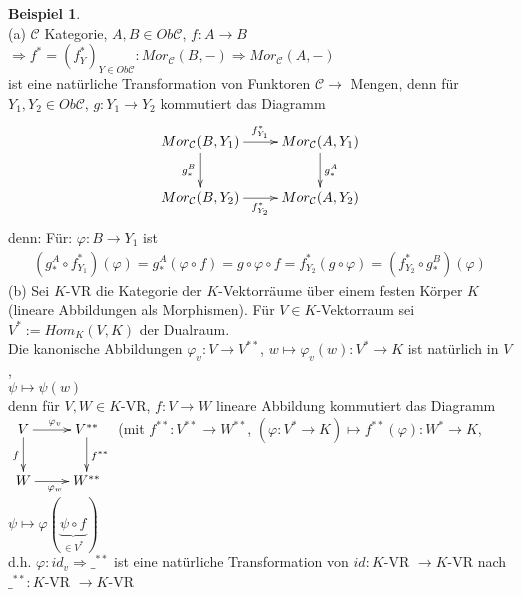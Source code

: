 \documentclass[10pt,a4paper,numbers=endperiod]{scrreprt}
\theoremstyle{definition}
\newtheorem{bsp}[satz]{Beispiel}
\begin{document}
\begin{bsp}
	$ $\\
	(a) $\mathcal{C}$ Kategorie, $A, B \in Ob \mathcal{C}$, $f: A \rightarrow B$\\
	$\Rightarrow f^* = (f_Y^*)_{Y \in Ob \mathcal{C}}: Mor_{\mathcal{C}} (B, -) \Rightarrow Mor_{\mathcal{C}}(A, -)$\\
	ist eine natürliche Transformation von Funktoren $\mathcal{C} \rightarrow$ Mengen, denn für $Y_1, Y_2 \in Ob \mathcal{C}$, $g: Y_1 \rightarrow Y_2$ kommutiert das Diagramm \begin{align*}
	\begin{xy}
	\xymatrix{
		Mor_\mathcal{C} (B, Y_1) \ar[r]^{f_{Y_1}^*} \ar[d]_{g_*^B}    &   Mor_\mathcal{C} (A, Y_1) \ar[d]^{g_*^A} \\
		Mor_\mathcal{C} (B, Y_2) \ar[r]_{f_{Y_2}^*} &   Mor_\mathcal{C} (A, Y_2)
	}
	\end{xy}
	\end{align*}
	denn: Für: $\varphi: B \rightarrow Y_1$ ist \begin{align*}
	(g_*^A \circ f_{Y_1}^*)(\varphi) = g_*^A (\varphi \circ f) = g \circ \varphi \circ f = f_{Y_2}^* (g \circ \varphi) = (f_{Y_2}^* \circ g_*^B) (\varphi) 
	\end{align*}
	(b) Sei $K$-VR die Kategorie der $K$-Vektorräume über einem festen Körper $K$ (lineare Abbildungen als Morphismen). Für $V \in K$-Vektorraum sei $V^* := Hom_K(V, K)$ der Dualraum.\\
	Die kanonische Abbildungen $\varphi_v: V \rightarrow V^{**}$, $w \mapsto \varphi_v(w): V^* \rightarrow K$ ist natürlich in $V$,\\
	\hspace*{81mm}	$\psi \mapsto \psi(w)$\\
	denn für $V, W \in K$-VR, $f: V \to W$ lineare Abbildung kommutiert das Diagramm\\ 
	$\begin{xy}
		\xymatrix{
			V \ar[r]^{\varphi_v} \ar[d]_{f}    &   V^{**} \ar[d]^{f^{**}} \\
			W \ar[r]_{\varphi_w} & W^{**}  
		}
	\end{xy}$  (mit $f^{**}: V^{**} \to W^{**}$, $(\varphi: V^* \to K) \mapsto f^{**}(\varphi): W^* \rightarrow K$, $\psi \mapsto \varphi(\underbrace{\psi \circ f}_{\in V^*})$\\
	d.h. $\varphi: id_v \Rightarrow \_^{**}$ ist eine natürliche Transformation von $id: K$-VR $\to K$-VR nach $\_^{**}: K$-VR $\to K$-VR
\end{bsp}
\end{document}
